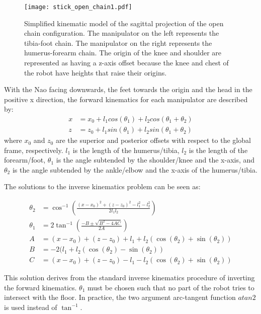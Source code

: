 \begin{figure}
	\centering
	\texttt{[image: stick\_open\_chain1.pdf]}
	\caption
	{Simplified kinematic model of the sagittal projection of the open chain configuration.
	The manipulator on the left represents the tibia-foot chain. The manipulator on the right
	represents the humerus-forearm chain. The origin of the knee and shoulder are represented as 
	having a z-axis offset because the knee and chest of the robot have heights that raise their 
	origins.}
	\label{fig:open_chain1}
\end{figure}

With the Nao facing downwards, the feet towards the origin and the head in the positive x direction, 
the forward kinematics for each manipulator are described by:
\begin{align}
	x &= x_0 + l_1 cos(\theta_1) + l_2 cos(\theta_1 + \theta_2) \\
	z &= z_0 + l_1 sin(\theta_1) + l_2 sin(\theta_1 + \theta_2)
\end{align}
where $x_0$ and $z_0$ are the superior and posterior offsets with respect to the global frame, respectively. $l_1$ is the length of the
humerus/tibia, $l_2$ is the length of the forearm/foot, $\theta_1$ is the angle subtended by the 
shoulder/knee and the x-axis, and $\theta_2$ is the angle subtended by the ankle/elbow and the x-axis of the humerus/tibia.

The solutions to the inverse kinematics problem can be seen as:

\begin{align}
	\theta_2 &= \cos^{-1} \left (\frac{(x - x_0)^2 + (z - z_0)^2 - l_1^2 - l_2^2}{2 l_1 l_2} \right ) \label{eq:open_fk_eq1}\\
	\theta_1 &= 2 \tan^{-1} \left (\frac{-B \pm \sqrt{B^2 - 4AC}}{2A} \right ) \label{eq:open_fk_eq2}\\
	A &= (x - x_0) + (z - z_0) + l_1 + l_2 (\cos(\theta_2) + \sin(\theta_2)) \\
	B &= -2(l_1 + l_2(\cos(\theta_2) - \sin(\theta_2)) \\
	C &= (x - x_0) + (z - z_0) - l_1 - l_2 (\cos(\theta_2) + \sin(\theta_2))
\end{align}

This solution derives from the standard inverse kinematics procedure of inverting the forward kinematics.
$\theta_1$ must be chosen such that no part of the robot tries to intersect with the floor. 
In practice, the two argument arc-tangent function $atan2$ is used instead of $\tan^{-1}$.

